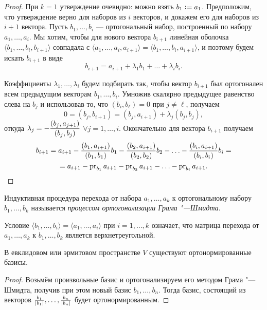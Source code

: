 \begin{proof}
    При $k = 1$ утверждение очевидно: можно взять $b_1 \vcentcolon = a_1$. Предположим, что утверждение верно для наборов из $i$ векторов, и докажем его для наборов из $i + 1$ вектора. Пусть $b_1, \ldots, b_i$ --- ортогональный набор, построенный по набору $a_1, \ldots, a_i$. Мы хотим, чтобы для нового вектора $b_{i + 1}$ линейная оболочка $\langle b_1, \ldots, b_i, b_{i + 1}\rangle$ совпадала с $\langle a_1, \ldots, a_i, a_{i + 1}\rangle = \langle b_1, \ldots, b_i, a_{i + 1}\rangle$, и поэтому будем искать $b_{i + 1}$ в виде
    \[
        b_{i + 1} = a_{i + 1} + \lambda_1b_1 + \ldots + \lambda_ib_i.
    \]

    Коэффициенты $\lambda_1, \ldots, \lambda_i$ будем подбирать так, чтобы вектор $b_{i + 1}$ был ортогонален всем предыдущим векторам $b_1, \ldots, b_i$. Умножив скалярно предыдущее равенство слева на $b_j$ и использовав то, что $(b_i, b_\ell) = 0$ при $j \ne \ell$, получаем
    \[
        0 = (b_j, b_{i + 1}) = (b_j, a_{i + 1}) + \lambda_j(b_j, b_j),
    \]
    откуда $\displaystyle\lambda_j = -\frac{(b_j, a_{j + 1})}{(b_j, b_j)}$ $\forall j = 1, \ldots, i$. Окончательно для вектора $b_{i + 1}$ получаем
    \begin{multline*}
        b_{i + 1} = a_{i + 1} - \frac{(b_1, a_{i + 1})}{(b_1, b_1)}b_1 - \frac{(b_2, a_{i + 1})}{(b_2, b_2)}b_2 - \ldots - \frac{(b_i, a_{i + 1})}{(b_i, b_i)}b_i =\\ = a_{i + 1} - \operatorname{pr}_{b_1}a_{i + 1} - \operatorname{pr}_{b_2}{a_{i + 1}} - \ldots - \operatorname{pr}_{b_i}{a_{i + 1}}.
    \end{multline*}
\end{proof}

\begin{definition}
    Индуктивная процедура перехода от набора $a_1, \ldots, a_k$ к ортогональному набору $b_1, \ldots, b_k$ называется \textit{процессом ортогонализации Грама "---Шмидта}.
\end{definition}

Условие $\langle b_1, \ldots, b_i\rangle = \langle a_1, \ldots, a_i\rangle$ при $i = 1, \ldots, k$ означает, что матрица перехода от $a_1, \ldots, a_k$ к $b_1, \ldots, b_k$ является верхнетреугольной.

\begin{corollary}
    В евклидовом или эрмитовом пространстве $V$ существуют ортонормированные базисы.
\end{corollary}

\begin{proof}
    Возьмём произвольные базис и ортогонализируем его методом Грама "---Шмидта, получив при этом новый базис $b_1, \ldots, b_n$. Тогда базис, состоящий из векторов $\frac{b_1}{\left\lvert b_1\right\rvert}, \ldots, \frac{b_n}{\left\lvert b_n\right\rvert}$ будет ортонормированным.
\end{proof}

